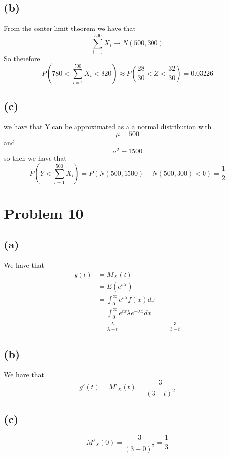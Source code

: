 \subsection*{(b)}
From the center limit theorem we have that $$\sum_{i=1}^{500}X_i\to N(500,300)$$
So therefore 
$$P(780<\sum_{i=1}^{500}X_i<820)\approx P(\frac{28}{30}<Z<\frac{32}{30})=\boxed{0.03226}$$
\subsection*{(c)}
we have that Y can be approximated as a a normal distribution with 
$$\mu=500$$ and $$\sigma^2=1500$$ so then we have
that 
$$P(Y<\sum_{i=1}^{500}X_i)=P(N(500,1500)-N(500,300)<0)=\boxed{\frac{1}{2}}$$
\section*{Problem 10}
\subsection*{(a)}
We have that 
\begin{align*}
    g(t)&=M_X(t)\\
    &=E(e^{tX})\\
    &=\int_{0}^{\infty}e^{tX}f(x)dx\\
    &=\int_{0}^{\infty}e^{tx}\lambda e^{-\lambda x}dx\\
    &=\frac{\lambda}{\lambda-t}
    &=\boxed{\frac{3}{3-t}}
\end{align*}
\subsection*{(b)}
We have that 
$$g'(t)=M'_X(t)=\boxed{\frac{3}{(3-t)^2}}$$
\subsection*{(c)}
$$M'_X(0)=\frac{3}{(3-0)^2}=\boxed{\frac{1}{3}}$$

